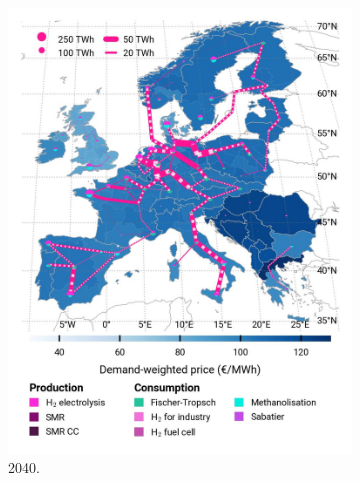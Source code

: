 \documentclass[preprint,12pt,sort&compress]{elsarticle}
\begin{document}
\begin{figure}[htbp]
\begin{subfigure}[t]{0.33\textwidth}
      \includegraphics[width=1\textwidth]{maps/pcipmi-national-expansion/base_s_adm___2040-balance_map_H2}
      \caption{ 2040.}
      \label{fig:PCI-n_lt_2040_h2}
  \end{subfigure}
  \begin{subfigure}[t]{0.33\textwidth}
    \vspace{0pt}

\end{subfigure}
\end{figure}
\end{document}
